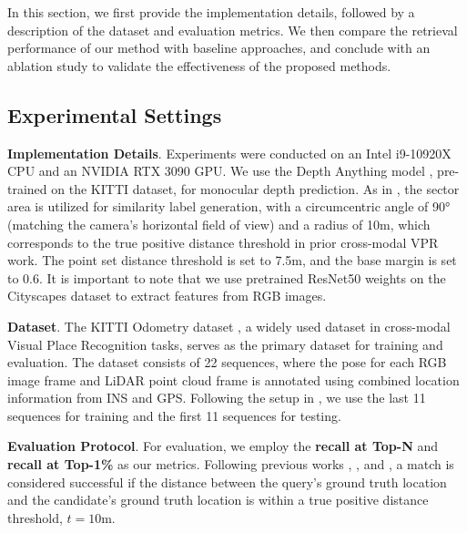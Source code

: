 In this section, we first provide the implementation details, followed by a description of the dataset and evaluation metrics. We then compare the retrieval performance of our method with baseline approaches, and conclude with an ablation study to validate the effectiveness of the proposed methods.

\subsection{Experimental Settings}

\textbf{Implementation Details}. Experiments were conducted on an Intel i9-10920X CPU and an NVIDIA RTX 3090 GPU. We use the Depth Anything model \cite{yang2024depth}, pre-trained on the KITTI dataset, for monocular depth prediction. As in \cite{leyva2023data}, the sector area is utilized for similarity label generation, with a circumcentric angle of 90° (matching the camera’s horizontal field of view) and a radius of 10m, which corresponds to the true positive distance threshold in prior cross-modal VPR work. The point set distance threshold is set to 7.5m, and the base margin is set to 0.6. It is important to note that we use pretrained ResNet50 weights on the Cityscapes dataset to extract features from RGB images.  

\textbf{Dataset}. The KITTI Odometry dataset \cite{geiger2012we}, a widely used dataset in cross-modal Visual Place Recognition tasks, serves as the primary dataset for training and evaluation. The dataset consists of 22 sequences, where the pose for each RGB image frame and LiDAR point cloud frame is annotated using combined location information from INS and GPS. Following the setup in \cite{yao2024monocular}, we use the last 11 sequences for training and the first 11 sequences for testing.

\textbf{Evaluation Protocol}. For evaluation, we employ the \textbf{recall at Top-N} and \textbf{recall at Top-1\%} as our metrics. Following previous works \cite{zheng2023i2p}, \cite{xie2024modalink}, and \cite{yao2024monocular}, a match is considered successful if the distance between the query’s ground truth location and the candidate’s ground truth location is within a true positive distance threshold, \( t = 10 \text{m} \).

